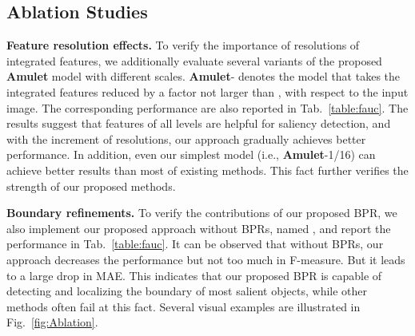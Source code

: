 \documentclass[10pt,twocolumn,letterpaper]{article}
\begin{document}
\subsection{Ablation Studies}
\textbf{Feature resolution effects.} To verify the importance of resolutions of integrated features, we additionally evaluate several variants of the proposed \textbf{Amulet} model with different scales.
\textbf{Amulet}- denotes the model that takes the integrated features reduced by a factor not larger than , with respect to the input image.
The corresponding performance are also reported in Tab.~\ref{table:fauc}.
The results suggest that features of all levels are helpful for saliency detection, and with the increment of resolutions, our approach gradually achieves better performance.
In addition, even our simplest model (i.e., \textbf{Amulet}-1/16) can achieve better results than most of existing methods.
This fact further verifies the strength of our proposed methods.

\textbf{Boundary refinements.}
To verify the contributions of our proposed BPR, we also implement our proposed approach without BPRs, named , and report the performance in Tab.~\ref{table:fauc}.
It can be observed that without BPRs, our approach decreases the performance but not too much in F-measure.
But it leads to a large drop in MAE. This indicates that our proposed BPR is capable of detecting and
localizing the boundary of most salient objects, while other methods often fail at this fact.
Several visual examples are illustrated in Fig.~\ref{fig:Ablation}.
\end{document}
